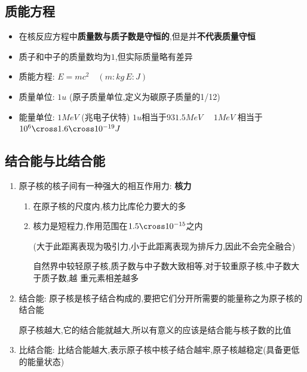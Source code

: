 \documentclass{article}
\begin{document}
\vspace*{2em}

\subsection{质能方程}
\begin{itemize}
    \item 在核反应方程中\textbf{质量数与质子数是守恒的},但是并\textbf{不代表质量守恒}
    \item 质子和中子的质量数均为$1$,但实际质量略有差异
    \item 质能方程: $ E = mc^{2} \quad (m:kg \, E:J)$
    \item 质量单位: $1u$ (原子质量单位,定义为碳原子质量的1/12)
    \item 能量单位: $1MeV$ (兆电子伏特) \quad $1u$相当于$ 931.5 MeV \quad $ $ 1MeV $ 相当于 $10^{6} \cross 1.6 \cross 10^{-19} J  $
\end{itemize}

\subsection{结合能与比结合能}
\begin{enumerate}
    \item 原子核的核子间有一种强大的相互作用力: \textbf{核力}
          \begin{enumerate}[label = (\alph*{})]
              \item 在原子核的尺度内,核力比库伦力要大的多
              \item 核力是短程力,作用范围在$1.5\cross10^{-15}$之内

                    (大于此距离表现为吸引力,小于此距离表现为排斥力,因此不会完全融合)

                    \vspace{-1em}
                    \begin{adjustbox}{minipage=0.93\linewidth, bgcolor=gray!20, padding=1em}
                        \small %
                        自然界中较轻原子核,质子数与中子数大致相等,对于较重原子核,中子数大于质子数,越
                        重元素相差越多
                    \end{adjustbox}
                    \vspace{-1em}

          \end{enumerate}

    \item 结合能: 原子核是核子结合构成的,要把它们分开所需要的能量称之为原子核的结合能

          原子核越大,它的结合能就越大,所以有意义的应该是结合能与核子数的比值

    \item 比结合能: 比结合能越大,表示原子核中核子结合越牢,原子核越稳定(具备更低的能量状态)

\end{enumerate}
\end{document}
